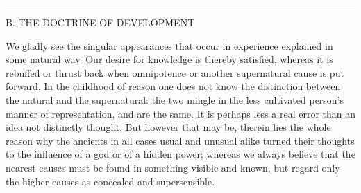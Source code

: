 \documentclass[12pt,a4paper,openany]{book}
\newcommand{\opage}[1]{\marginnote{\footnotesize\textit{[#1]}}}
\newcommand{\excerpthead}[1]{\par\bigskip\begin{center}#1\end{center}\nopagebreak\smallskip}
\newcommand{\sectionrule}{\par\begin{center}\rule{4em}{0.4pt}\end{center}}
\begin{document}
\sectionrule

\excerpthead{B. THE DOCTRINE OF DEVELOPMENT}


We gladly see the singular appearances that occur in experience explained in some
natural way. Our desire for knowledge is thereby satisfied, whereas it is rebuffed
or thrust back when omnipotence or another supernatural cause is put forward. In the
childhood of reason one does not know the distinction between the natural and the
supernatural: the two mingle in the less cultivated person's manner of
representation, and are the same. It is perhaps less a real error than an idea not
distinctly thought. But however that may be, therein lies the whole reason why the
ancients
\setcounter{footnote}{0}%
\opage{109}in all cases usual and unusual alike turned their thoughts to the influence of a
god or of a hidden power; whereas we always believe that the nearest causes must be
found in something visible and known, but regard only the higher causes as
concealed and supersensible.
\end{document}
